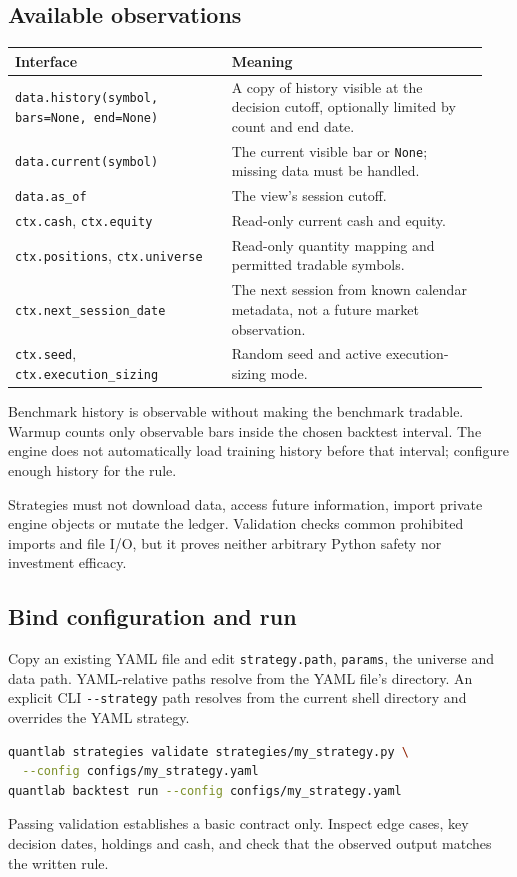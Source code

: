 \documentclass[11pt]{article}
\newcommand{\code}[1]{\nolinkurl{#1}}
\let\originalsubsection\subsection
\renewcommand{\subsection}{\Needspace{8\baselineskip}\originalsubsection}
\begin{document}
\subsection{Available observations}
\begin{longtable}{p{0.43\linewidth}p{0.51\linewidth}}
\toprule Interface & Meaning\\\midrule\endhead
\code{data.history(symbol, bars=None, end=None)} & A copy of history visible at the decision cutoff, optionally limited by count and end date.\\
\code{data.current(symbol)} & The current visible bar or \code{None}; missing data must be handled.\\
\code{data.as_of} & The view's session cutoff.\\
\code{ctx.cash}, \code{ctx.equity} & Read-only current cash and equity.\\
\code{ctx.positions}, \code{ctx.universe} & Read-only quantity mapping and permitted tradable symbols.\\
\code{ctx.next_session_date} & The next session from known calendar metadata, not a future market observation.\\
\code{ctx.seed}, \code{ctx.execution_sizing} & Random seed and active execution-sizing mode.\\
\bottomrule
\end{longtable}
Benchmark history is observable without making the benchmark tradable. Warmup counts only observable bars inside the chosen backtest interval. The engine does not automatically load training history before that interval; configure enough history for the rule.

Strategies must not download data, access future information, import private engine objects or mutate the ledger. Validation checks common prohibited imports and file I/O, but it proves neither arbitrary Python safety nor investment efficacy.

\subsection{Bind configuration and run}
Copy an existing YAML file and edit \code{strategy.path}, \code{params}, the universe and data path. YAML-relative paths resolve from the YAML file's directory. An explicit CLI \code{--strategy} path resolves from the current shell directory and overrides the YAML strategy.
\begin{lstlisting}[language=bash]
quantlab strategies validate strategies/my_strategy.py \
  --config configs/my_strategy.yaml
quantlab backtest run --config configs/my_strategy.yaml
\end{lstlisting}
Passing validation establishes a basic contract only. Inspect edge cases, key decision dates, holdings and cash, and check that the observed output matches the written rule.
\end{document}
